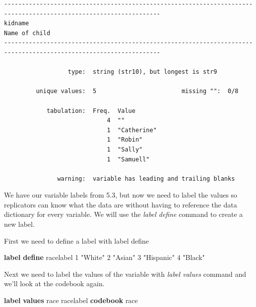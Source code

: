 \documentclass[
]{book}
\newenvironment{Shaded}{\begin{snugshade}}{\end{snugshade}}
\newcommand{\KeywordTok}[1]{\textcolor[rgb]{0.13,0.29,0.53}{\textbf{#1}}}
\newcommand{\NormalTok}[1]{#1}
\newcommand{\StringTok}[1]{\textcolor[rgb]{0.31,0.60,0.02}{#1}}
\begin{document}
\begin{verbatim}
------------------------------------------------------------------------------------------------------------------
kidname                                                                                              Name of child
------------------------------------------------------------------------------------------------------------------

                  type:  string (str10), but longest is str9

         unique values:  5                        missing "":  0/8

            tabulation:  Freq.  Value
                             4  ""
                             1  "Catherine"
                             1  "Robin"
                             1  "Sally"
                             1  "Samuell"

               warning:  variable has leading and trailing blanks
\end{verbatim}

We have our variable labels from 5.3, but now we need to label the values so replicators can know what the data are without having to reference the data dictionary for every variable. We will use the \emph{label define} command to create a new label.

First we need to define a label with label define

\begin{Shaded}
\begin{Highlighting}[]
\KeywordTok{label} \KeywordTok{define}\NormalTok{ racelabel 1 }\StringTok{"White"}\NormalTok{ 2 }\StringTok{"Asian"}\NormalTok{ 3 }\StringTok{"Hispanic"}\NormalTok{ 4 }\StringTok{"Black"}
\end{Highlighting}
\end{Shaded}

Next we need to label the values of the variable with \emph{label values} command and we'll look at the codebook again.

\begin{Shaded}
\begin{Highlighting}[]
\KeywordTok{label} \KeywordTok{values}\NormalTok{ race racelabel}
\KeywordTok{codebook}\NormalTok{ race}
\end{Highlighting}
\end{Shaded}
\end{document}
